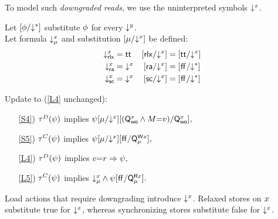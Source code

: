 To model such \emph{downgraded reads}, we use the uninterpreted symbols
$\mathord{\downarrow^{x}}$.  

\begin{definition}
  \label{def:DS}
  Let $[\phi/\mathord{\downarrow^{*}}]$ substitute $\phi$ for every $\mathord{\downarrow^{y}}$.\\
  Let formula $\mathord{\downarrow^{x}_{\mu}}$ and substitution ${[}{\mu}/\mathord{\downarrow^{x}}{]}$ be defined:
  \begin{align*}
    \DL{\aLoc}{\mRLX}&=\TRUE
    &\DS{\aLoc}{\mRLX}&=[\TRUE/\Dx{\aLoc}] 
    \\
    \DL{\aLoc}{\mRA}&=\Dx{\aLoc}%
    &\DS{\aLoc}{\mRA}&=[\FALSE/\D]
    \\
    \DL{\aLoc}{\mSC}&=\Dx{\aLoc}%
    &\DS{\aLoc}{\mSC}&=[\FALSE/\D]
  \end{align*}
\end{definition}
\begin{definition}[\xCO/\xRASC/\xDGR]
  \label{def:pomsets-down}
  Update  to (\ref{L4} unchanged):
  \begin{enumerate}
  \item[\ref{S4})]
    $\aTr{\bEvs}{\bForm}$ implies
    \begin{math}
      \psi
      {[}{\mu}/\mathord{\downarrow^{x}}{]}
      [(\mathsf{Q}_{\mathsf{wo}}^{x}\land M{=}v)/\mathsf{Q}_{\mathsf{wo}}^{x}],
    \end{math}
  \item[\ref{S5})]
    $\aTr{\cEvs}{\bForm}$ implies
    \begin{math}
      \psi
      {[}{\mu}/\mathord{\downarrow^{x}}{]}
      [\mkern.6mu\mathsf{ff}\mkern.6mu/\smash{\mathsf{Q}_{\mu}^{\mathsf{W}x}}],
    \end{math}
  \item[\ref{L4})]
    $\aTr{\bEvs}{\bForm}$ implies
    \begin{math}
      v{=}r\Rightarrow\psi,
    \end{math}
  \item[\ref{L5})]
    $\aTr{\cEvs}{\bForm}$ implies
    \begin{math}
      \mathord{\downarrow^{x}_{\mu}}\land \psi[\mkern.6mu\mathsf{ff}\mkern.6mu/\smash{\mathsf{Q}_{\mu}^{\mathsf{R}x}}].
    \end{math}
  \end{enumerate}
\end{definition}
Load actions that require downgrading introduce $\mathord{\downarrow^{x}}$.
Relaxed stores on $x$ substitute true for $\mathord{\downarrow^{x}}$, whereas
synchronizing stores substitute false for $\mathord{\downarrow^{x}}$.

